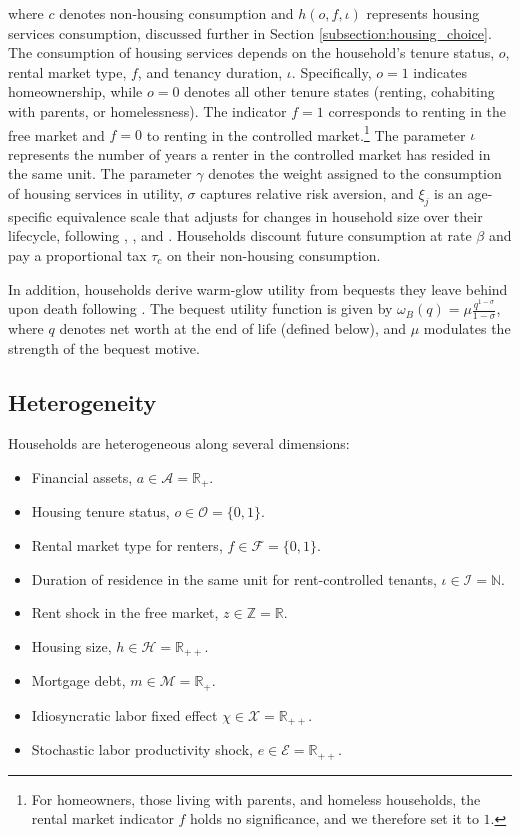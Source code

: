 \documentclass[parskip=full]{article}
\begin{document}
\noindent where $c$ denotes non-housing consumption and $h(o,f,\iota)$ represents housing services consumption, discussed further in Section \ref{subsection:housing_choice}. The consumption of housing services depends on the household's tenure status, $o$, rental market type, $f$, and tenancy duration, $\iota$. Specifically, $o=1$ indicates homeownership, while $o=0$ denotes all other tenure states (renting, cohabiting with parents, or homelessness). The indicator $f=1$ corresponds to renting in the free market and $f=0$ to renting in the controlled market.\footnote{For homeowners, those living with parents, and homeless households, the rental market indicator $f$ holds no significance, and we therefore set it to $1$.} The parameter $\iota$ represents the number of years a renter in the controlled market has resided in the same unit. The parameter $\gamma$ denotes the weight assigned to the consumption of housing services in utility, $\sigma$ captures relative risk aversion, and $\xi_{j}$ is an age-specific equivalence scale that adjusts for changes in household size over their lifecycle, following \citet{lm-1980}, \citet{wz-2010}, and \citet{xu-2013}. Households discount future consumption at rate $\beta$ and pay a proportional tax $\tau_{c}$ on their non-housing consumption.

In addition, households derive warm-glow utility from bequests they leave behind upon death following \citet{cagetti-denardi-2006}. The bequest utility function is given by $\omega_{B}(q)=\mu \frac{q^{1-\sigma}}{1-\sigma}$, where $q$ denotes net worth at the end of life (defined below), and $\mu$ modulates the strength of the bequest motive.

\subsection{Heterogeneity}

Households are heterogeneous along several dimensions:

\begin{itemize}
    \item Financial assets, $a\in \mathcal{A}=\mathbb{R}_{+}$.
    \item Housing tenure status, $o \in \mathcal{O}=\{0,1\}$.
    \item Rental market type for renters, $f \in \mathcal{F}=\{0,1\}$.
    \item Duration of residence in the same unit for rent-controlled tenants, $\iota \in \mathcal{I}=\mathbb{N}$.
    \item Rent shock in the free market, $z \in \mathbb{Z}=\mathbb{R}$.
    \item Housing size, $h\in \mathcal{H}=\mathbb{R}_{++}$.
    \item Mortgage debt, $m \in \mathcal{M}=\mathbb{R}_{+}$.
    \item Idiosyncratic labor fixed effect $\chi \in \mathcal{X}=\mathbb{R}_{++}$.
    \item Stochastic labor productivity shock, $e \in \mathcal{E} = \mathbb{R}_{++}$.
\end{itemize}
 
\end{document}
